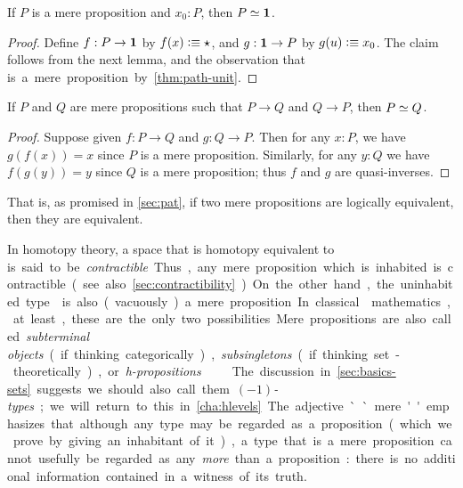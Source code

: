\begin{lem}\label{thm:inhabprop-eqvunit}
  If $P$ is a mere proposition and $x_0:P$, then $P \simeq \mathbf{1}$.
\end{lem}
\begin{proof}
  Define $f:P\to\mathbf{1}$ by $f(x)\vcentcolon\equiv \star$, and $g:\mathbf{1}\to P$ by $g(u)\vcentcolon\equiv x_0$.
  The claim follows from the next lemma, and the observation that \unit is a mere proposition by \autoref{thm:path-unit}.
\end{proof}

\begin{lem}\label{lem:equiv-iff-hprop}
  If $P$ and $Q$ are mere propositions such that $P\to Q$ and $Q\to P$, then $P \simeq Q$.
\end{lem}
\begin{proof}
  Suppose given $f:P\to Q$ and $g:Q\to P$.
  Then for any $x:P$, we have $g(f(x))=x$ since $P$ is a mere proposition.
  Similarly, for any $y:Q$ we have $f(g(y))=y$ since $Q$ is a mere proposition; thus $f$ and $g$ are quasi-inverses.
\end{proof}

That is, as promised in \autoref{sec:pat}, if two mere propositions are logically equivalent, then they are equivalent.

In homotopy theory, a space that is homotopy equivalent to \unit is said to be \emph{contractible}.
Thus, any mere proposition which is inhabited is contractible (see also \autoref{sec:contractibility}).
On the other hand, the uninhabited type \emptyt is also (vacuously) a mere proposition.
In classical mathematics, at least, these are the only two possibilities.

Mere propositions are also called \emph{subterminal objects} (if thinking categorically), \emph{subsingletons} (if thinking set-theoretically), or \emph{h-propositions}.
%
%
%
The discussion in \autoref{sec:basics-sets} suggests we should also call them \emph{$(-1)$-types}; we will return to this in \autoref{cha:hlevels}.
The adjective ``mere'' emphasizes that although any type may be regarded as a proposition (which we prove by giving an inhabitant of it), a type that is a mere proposition cannot usefully be regarded as any \emph{more} than a proposition: there is no additional information contained in a witness of its truth.

